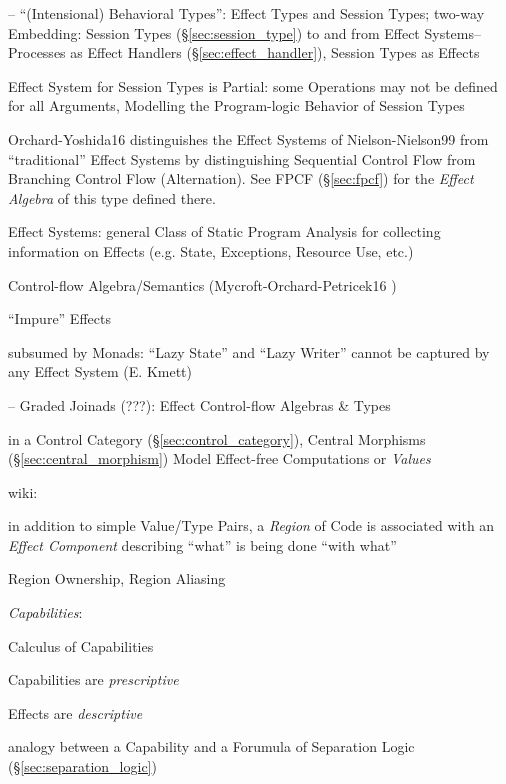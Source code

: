 \cite{orchard-yoshida16} -- ``(Intensional) Behavioral Types'': Effect
Types and Session Types; two-way Embedding: Session Types
(\S\ref{sec:session_type}) to and from Effect Systems--Processes as
Effect Handlers (\S\ref{sec:effect_handler}), Session Types as Effects

Effect System for Session Types is Partial: some Operations may not be
defined for all Arguments, Modelling the Program-logic Behavior of
Session Types \cite{orchard-yoshida16} %

\fist Orchard-Yoshida16 \cite{orchard-yoshida16} distinguishes the
Effect Systems of Nielson-Nielson99 \cite{nielson-nielson99} from
``traditional'' Effect Systems by distinguishing Sequential Control
Flow from Branching Control Flow (Alternation). See FPCF
(\S\ref{sec:fpcf}) for the \emph{Effect Algebra} of this type defined
there.

Effect Systems: general Class of Static Program Analysis for
collecting information on Effects (e.g. State, Exceptions, Resource
Use, etc.) \cite{orchard-yoshida16}

Control-flow Algebra/Semantics (Mycroft-Orchard-Petricek16
\cite{mycroft-orchard-petricek16})

``Impure'' Effects

subsumed by Monads: ``Lazy State'' and ``Lazy Writer'' cannot be
captured by any Effect System (E. Kmett)

\cite{mycroft-orchard-petricek16} -- Graded Joinads (???): Effect
Control-flow Algebras \& Types

in a Control Category (\S\ref{sec:control_category}), Central
Morphisms (\S\ref{sec:central_morphism}) Model Effect-free
Computations or \emph{Values} %

wiki:

in addition to simple Value/Type Pairs, a \emph{Region} of Code is
associated with an \emph{Effect Component} describing ``what'' is
being done ``with what''

Region Ownership, Region Aliasing


\emph{Capabilities}: %

Calculus of Capabilities

Capabilities are \emph{prescriptive}

Effects are \emph{descriptive}

analogy between a Capability and a Forumula of Separation Logic
(\S\ref{sec:separation_logic})

